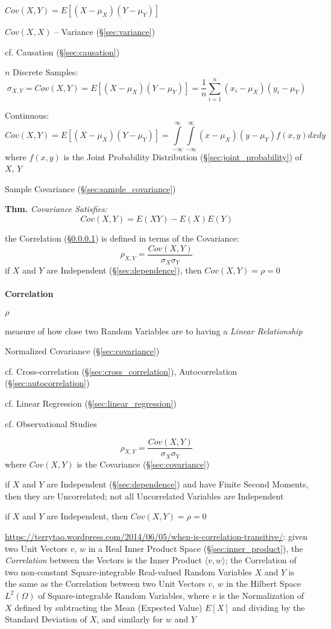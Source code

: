 $Cov(X,Y) = E [(X - \mu_X)(Y - \mu_Y)]$

$Cov(X,X)$ -- Variance (\S\ref{sec:variance})

\fist cf. Causation (\S\ref{sec:causation})

$n$ Discrete Samples:
\[
  \sigma_{X,Y} = Cov(X,Y) = E [(X - \mu_X)(Y - \mu_Y)] =
    \frac{1}{n} \sum_{i=1}^n (x_i - \mu_X) (y_i - \mu_Y)
\]

Continuous:
\[
  Cov(X,Y) = E [(X - \mu_X)(Y - \mu_Y)] =
  \int\limits_{-\infty}^{\infty} \int\limits_{-\infty}^{\infty}
  (x - \mu_X) (y - \mu_Y) f(x,y) dx dy
\]
where $f(x,y)$ is the Joint Probability Distribution
(\S\ref{sec:joint_probability}) of $X$, $Y$

\fist Sample Covariance (\S\ref{sec:sample_covariance})

\textbf{Thm.} \emph{Covariance Satisfies:
  \[
    Cov(X,Y) = E(XY) - E(X)E(Y)
  \]
}

the Correlation (\S\ref{sec:statistical_correlation}) is defined in terms of the
Covariance:
\[
  \rho_{X,Y} = \frac{Cov(X,Y)}{\sigma_X \sigma_Y}
\]
if $X$ and $Y$ are Independent (\S\ref{sec:dependence}), then
$Cov(X,Y) = \rho = 0$



\paragraph{Correlation}\label{sec:statistical_correlation}\hfill

$\rho$

measure of how close two Random Variables are to having a \emph{Linear
  Relationship}

Normalized Covariance (\S\ref{sec:covariance})

\fist cf. Cross-correlation (\S\ref{sec:cross_correlation}), Autocorrelation
(\S\ref{sec:autocorrelation})

\fist cf. Linear Regression (\S\ref{sec:linear_regression})

cf. Observational Studies

\[
  \rho_{X,Y} = \frac{Cov(X,Y)}{\sigma_X \sigma_Y}
\]
where $Cov(X,Y)$ is the Covariance (\S\ref{sec:covariance})

if $X$ and $Y$ are Independent (\S\ref{sec:dependence}) and have Finite Second
Moments, then they are Uncorrelated; not all Uncorrelated Variables are
Independent

if $X$ and $Y$ are Independent, then $Cov(X,Y) = \rho = 0$

\url{https://terrytao.wordpress.com/2014/06/05/when-is-correlation-transitive/}:
given two Unit Vectors $v$, $w$ in a Real Inner Product Space
(\S\ref{sec:inner_product}), the \emph{Correlation} between the Vectors is the
Inner Product $\langle{v,w}\rangle$; the Correlation of two non-constant
Square-integrable Real-valued Random Variables $X$ and $Y$ is the same as the
Correlation between two Unit Vectors $v$, $w$ in the Hilbert Space $L^2(\Omega)$
of Square-integrable Random Variables, where $v$ is the Normalization of $X$
defined by subtracting the Mean (Expected Value) $E[X]$ and dividing by the
Standard Deviation of $X$, and similarly for $w$ and $Y$



